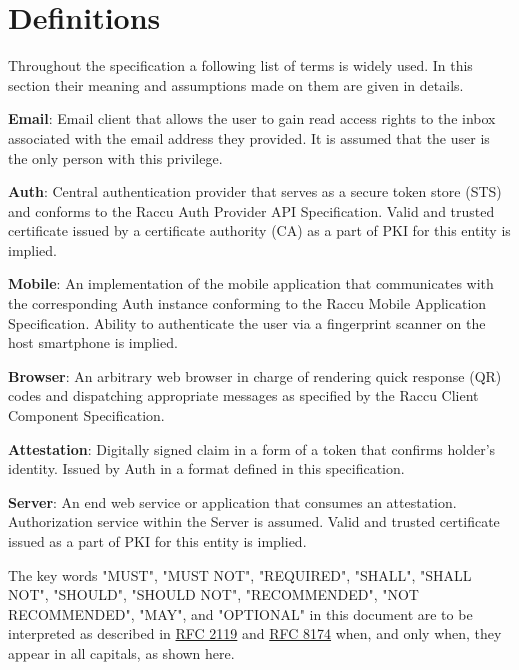 \section{Definitions}
Throughout the specification a following list of terms is widely used. In this section their meaning and assumptions 
made on them are given in details.

\medskip
\textbf{Email}: Email client that allows the user to gain read access rights to the inbox associated
with the email address they provided. It is assumed that the user is the only person with this privilege.

\medskip
\textbf{Auth}: Central authentication provider that serves as a secure token store (STS) and conforms to 
the Raccu Auth Provider API Specification. Valid and trusted certificate issued by a certificate authority
(CA) as a part of PKI for this entity is implied.

\medskip
\textbf{Mobile}: An implementation of the mobile application that communicates with the corresponding Auth instance 
conforming to the Raccu Mobile Application Specification. Ability to authenticate the user via a fingerprint scanner
on the host smartphone is implied.

\medskip
\textbf{Browser}: An arbitrary web browser in charge of rendering quick response (QR) codes and dispatching appropriate 
messages as specified by the Raccu Client Component Specification.

\medskip
\textbf{Attestation}: Digitally signed claim in a form of a token that confirms holder's identity. Issued by 
Auth in a format defined in this specification.

\medskip
\textbf{Server}: An end web service or application that consumes an attestation. Authorization service within the 
Server is assumed. Valid and trusted certificate issued as a part of PKI for this entity is implied.

\medskip
The key words "MUST", "MUST NOT", "REQUIRED", "SHALL", "SHALL NOT", "SHOULD", "SHOULD NOT", "RECOMMENDED", 
"NOT RECOMMENDED", "MAY", and "OPTIONAL" in this document are to be interpreted as described in 
\href{https://tools.ietf.org/html/rfc2119}{RFC 2119} and \href{https://tools.ietf.org/html/rfc8174}{RFC 8174} 
when, and only when, they appear in all capitals, as shown here.
